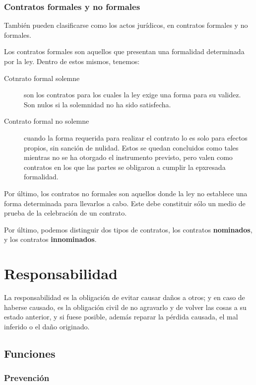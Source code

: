 \documentclass[../resumen.tex]{subfiles}
\begin{document}
\subsubsection{Contratos formales y no formales}

También pueden clasificarse como los actos jurídicos, en contratos formales y 
no formales.

Los contratos formales son aquellos que presentan una formalidad determinada
por la ley. Dentro de estos mismos, tenemos:

\begin{description}
  \item[Cotnrato formal solemne] son los contratos para los cuales la ley exige
    una forma para su validez. Son nulos si la solemnidad no ha sido 
    satisfecha.

  \item[Contrato formal no solemne] cuando la forma requerida para realizar el
     contrato lo es solo para efectos propios, sin sanción de nulidad. Estos
     se quedan concluidos como tales mientras no se ha otorgado el instrumento
     previsto, pero valen como contratos en los que las partes se obligaron
     a cumplir la epxresada formalidad.
\end{description}

Por último, los contratos no formales son aquellos donde la ley no establece una
forma determinada para llevarlos a cabo. Este debe constituir sólo un medio de
prueba de la celebración de un contrato.

Por último, podemos distinguir dos tipos de contratos, los contratos \textbf{nominados},
y los contratos \textbf{innominados}.

\section{Responsabilidad}

La responsabilidad es la obligación de evitar causar daños a otros; y en caso
de haberse causado, es la obligación civil de no agravarlo y de volver las cosas
a su estado anterior, y si fuese posible, además reparar la pérdida causada, el 
mal inferido o el daño originado.

\subsection{Funciones}

\subsubsection{Prevención}
\end{document}
